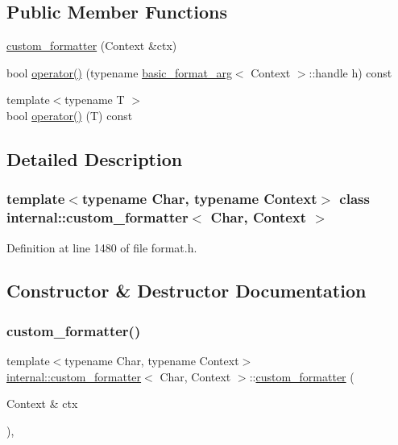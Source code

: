 \subsection*{Public Member Functions}
\begin{DoxyCompactItemize}
\item 
\hyperlink{classinternal_1_1custom__formatter_a03b72e794cb1144955f31214a932e548}{custom\+\_\+formatter} (Context \&ctx)
\item 
bool \hyperlink{classinternal_1_1custom__formatter_a3e431cda430aa3c0e55fe202bc6f0cca}{operator()} (typename \hyperlink{classbasic__format__arg}{basic\+\_\+format\+\_\+arg}$<$ Context $>$\+::handle h) const
\item 
{\footnotesize template$<$typename T $>$ }\\bool \hyperlink{classinternal_1_1custom__formatter_aedd6d67c1caa7ed1867bfd7e859c261a}{operator()} (T) const
\end{DoxyCompactItemize}


\subsection{Detailed Description}
\subsubsection*{template$<$typename Char, typename Context$>$\newline
class internal\+::custom\+\_\+formatter$<$ Char, Context $>$}



Definition at line 1480 of file format.\+h.



\subsection{Constructor \& Destructor Documentation}
\mbox{\label{classinternal_1_1custom__formatter_a03b72e794cb1144955f31214a932e548}} 
\subsubsection{\texorpdfstring{custom\+\_\+formatter()}{custom\_formatter()}}
{\footnotesize\ttfamily template$<$typename Char, typename Context$>$ \\
\hyperlink{classinternal_1_1custom__formatter}{internal\+::custom\+\_\+formatter}$<$ Char, Context $>$\+::\hyperlink{classinternal_1_1custom__formatter}{custom\+\_\+formatter} (\begin{DoxyParamCaption}\item[{Context \&}]{ctx }\end{DoxyParamCaption})\hspace{0.3cm}{\ttfamily [inline]}, {\ttfamily [explicit]}}



